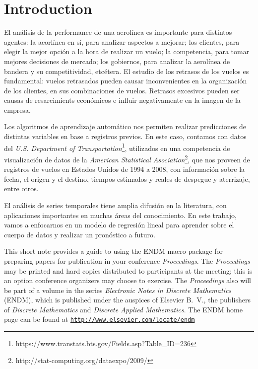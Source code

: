 \section{Introduction}\label{intro}

El an\'alisis de la performance de una aerol\'inea es importante para
distintos agentes: la aeorl\'inea en s\'i, para analizar aspectos a 
mejorar; los clientes, para elegir la mejor opci\'on a la hora de realizar
un vuelo; la competencia, para tomar mejores decisiones de mercado;
los gobiernos, para analizar la aerol\'inea de bandera y su 
competitividad, etc\'etera. El estudio de los retrasos de los vuelos
es fundamental: vuelos retrasados pueden causar inconvenientes en
la organizaci\'on de los clientes, en sus combinaciones de vuelos.
Retrasos excesivos pueden ser causas de resarcimients econ\'omicos
e influir negativamente en la imagen de la empresa.

Los algoritmos de aprendizaje autom\'atico nos permiten realizar
predicciones de distintas variables en base a registros previos.
En este caso, contamos con datos del \textit{U.S. Department
of Transportation}\footnote{https://www.transtats.bts.gov/Fields.asp?Table\_ID=236},
utilizados en una competencia de visualización
de datos de la \textit{American Statistical Asociation}\footnote{
http://stat-computing.org/dataexpo/2009/}, que nos proveen
de registros de vuelos en Estados Unidos de 1994 a 2008, con
informaci\'on sobre la fecha, el origen y el destino, tiempos
estimados y reales de despegue y aterrizaje, entre otros.

El an\'alisis de series temporales tiene amplia difusi\'on en la
literatura, con aplicaciones importantes en muchas \'areas del
conocimiento. En este trabajo, vamos a enfocarnos en un modelo de regresi\'on
lineal para aprender sobre el cuerpo de datos y realizar un pron\'ostico
a futuro.

This short note provides a guide to using the ENDM macro package for
preparing papers for publication in your conference \emph{Proceedings}.
The \emph{Proceedings} may be printed and hard copies distributed to
participants at the meeting; this is an option conference organizers
may choose to exercise.  The \emph{Proceedings} also will be part of
a volume in the series \emph{Electronic Notes in Discrete Mathematics}
(ENDM), which is published under the auspices of Elsevier B.~V., the
publishers of \emph{Discrete Mathematics} and \emph{Discrete Applied
Mathematics}. The ENDM home page can be found at
\href{http://www.elsevier.com/locate/endm}
{\texttt{http://www.elsevier.com/locate/endm}}

